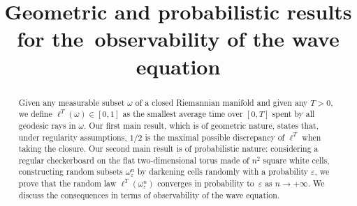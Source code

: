 \documentclass[JEP,XML,SOM,Unicode, NoEqCountersInSection,NoFloatCountersInSection,published]{cedram}
\theoremstyle{definition}
\begin{document}
\frontmatter
\title{Geometric and probabilistic results for the~observability of the wave equation}

\author[\initial{E.} \lastname{Humbert}]{ }
\address{Institut Denis Poisson, UFR Sciences et Technologie, Faculté François Rabelais\\
Parc de Grandmont, 37200 Tours, France}

\author[\initial{Y.} \lastname{Privat}]{ }
\address{IRMA, Université de Strasbourg, CNRS UMR 7501\\
7 rue René Descartes, 67084 Strasbourg, France\\
\& Institut Universitaire de France (IUF)}

\author[\initial{E.} \lastname{Trélat}]{ }
\address{Sorbonne Université, CNRS, Université de Paris, Inria, Laboratoire Jacques-Louis Lions (LJLL)\\
F-75005 Paris, France}

\begin{abstract}
Given any measurable subset $\omega$ of a closed Riemannian manifold and given any $T>0$, we define $\ell^T(\omega)\in[0,1]$ as the smallest average time over $[0,T]$ spent by all geodesic rays in $\omega$. Our first main result, which is of geometric nature, states that, under regularity assumptions, $1/2$ is the maximal possible discrepancy of $\ell^T$ when taking the closure. Our second main result is of probabilistic nature: considering a regular checkerboard on the flat two-dimensional torus made of $n^2$ square white cells, constructing random subsets $\omega_\varepsilon^n$ by darkening cells randomly with a probability $\varepsilon$, we prove that the random law $\ell^T(\omega_\varepsilon^n)$ converges in probability to~$\varepsilon$ as $n\rightarrow+\infty$. We discuss the consequences in terms of observability of the wave equation.
\end{abstract}
\end{document}
